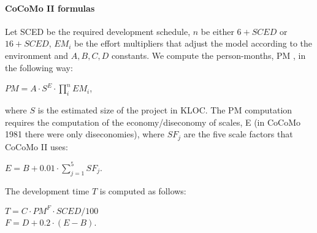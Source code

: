 \paragraph{CoCoMo II formulas}
Let SCED be the required development schedule, $n$ be either $6 + SCED$ or $16 + SCED$, $EM_i$ be the effort multipliers that adjust the model according to the environment and $A,B,C,D$ constants.
We compute the person-months, PM , in the following way:
\begin{center}
    $PM = A \cdot S^E \cdot \prod_{i}^{n} EM_i$,
\end{center}
where $S$ is the estimated size of the project in KLOC.
The PM computation requires the computation of the economy/diseconomy of scales, E (in CoCoMo 1981 there were only diseconomies), where $SF_j$ are the five scale factors that CoCoMo II uses:
\begin{center}
    $E = B + 0.01 \cdot \sum_{j=1}^{5} SF_j$.
\end{center}
The development time $T$ is computed as follows:
\begin{center}
    $T = C \cdot PM^F \cdot SCED / 100$\\
    $F = D + 0.2 \cdot (E - B)$.
\end{center}

